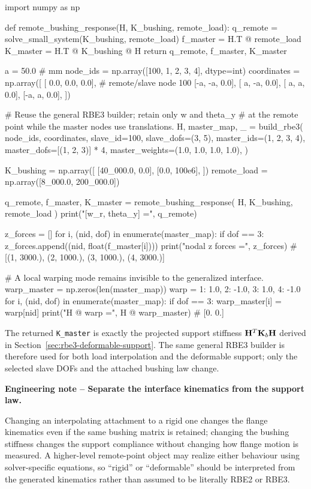 \begin{python}
import numpy as np


def remote_bushing_response(H, K_bushing, remote_load):
    q_remote = solve_small_system(K_bushing, remote_load)
    f_master = H.T @ remote_load
    K_master = H.T @ K_bushing @ H
    return q_remote, f_master, K_master


a = 50.0  # mm
node_ids = np.array([100, 1, 2, 3, 4], dtype=int)
coordinates = np.array([
    [ 0.0,  0.0, 0.0],  # remote/slave node 100
    [-a,   -a,   0.0],
    [ a,   -a,   0.0],
    [ a,    a,   0.0],
    [-a,    a,   0.0],
])

# Reuse the general RBE3 builder; retain only w and theta_y
# at the remote point while the master nodes use translations.
H, master_map, _ = build_rbe3(
    node_ids, coordinates,
    slave_id=100,
    slave_dofs=(3, 5),
    master_ids=(1, 2, 3, 4),
    master_dofs=[(1, 2, 3)] * 4,
    master_weights=(1.0, 1.0, 1.0, 1.0),
)

K_bushing = np.array([
    [40_000.0, 0.0],
    [0.0, 100e6],
])
remote_load = np.array([8_000.0, 200_000.0])

q_remote, f_master, K_master = remote_bushing_response(
    H, K_bushing, remote_load
)
print("[w_r, theta_y] =", q_remote)

z_forces = []
for i, (nid, dof) in enumerate(master_map):
    if dof == 3:
        z_forces.append((nid, float(f_master[i])))
print("nodal z forces =", z_forces)
# [(1, 3000.), (2, 1000.), (3, 1000.), (4, 3000.)]

# A local warping mode remains invisible to the generalized interface.
warp_master = np.zeros(len(master_map))
warp = {1: 1.0, 2: -1.0, 3: 1.0, 4: -1.0}
for i, (nid, dof) in enumerate(master_map):
    if dof == 3:
        warp_master[i] = warp[nid]
print("H @ warp =", H @ warp_master)
# [0. 0.]
\end{python}

The returned \texttt{K\_master} is exactly the projected support stiffness
$\mathbf{H}^T\mathbf{K}_b\mathbf{H}$ derived in
Section~\ref{sec:rbe3-deformable-support}. The same general RBE3 builder is
therefore used for both load interpolation and the deformable support; only the
selected slave DOFs and the attached bushing law change.

\begin{bbox}
\textbf{Engineering note -- Separate the interface kinematics from the support law.}

Changing an interpolating attachment to a rigid one changes the flange
kinematics even if the same bushing matrix is retained; changing the bushing
stiffness changes the support compliance without changing how flange motion is
measured. A higher-level remote-point object may realize either behaviour using
solver-specific equations, so ``rigid'' or ``deformable'' should be interpreted
from the generated kinematics rather than assumed to be literally RBE2 or RBE3.
\end{bbox}


